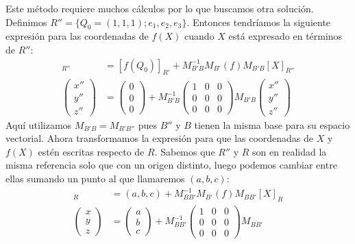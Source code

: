 \documentclass[14pt]{book}
\begin{document}
\begin{ej}
	Este método requiere muchos cálculos por lo que buscamos otra solución. Definimos $R'' = \{Q_0 = (1,1,1); e_1, e_2, e_3\}$. Entonces tendríamos la siguiente expresión para las coordenadas de $f(X)$ cuando $X$ está expresado en términos de $R''$:
		\begin{align*}
	[f(X)]_{R''} &= [f(Q_0)]_{R'} + M_{B'B}^{-1}M_{B'}(f)M_{B'B} [X]_{R''} \\
	\left(\begin{array}{c}
	x'' \\ y'' \\ z''
	\end{array}\right) &=
	\left(\begin{array}{c}
	0 \\ 0 \\ 0
	\end{array}\right) + M_{B'B}^{-1}
	\left(\begin{array}{ccc}
	1 & 0 & 0 \\ 0 & 0 & 0 \\ 0 & 0 & 0
	\end{array}\right) M_{B'B}
	\left(\begin{array}{c}
	x'' \\ y'' \\ z''
	\end{array}\right)
	\end{align*}
	Aquí utilizamos $M_{B'B} = M_{B'B''}$ pues $B''$ y $B$ tienen la misma base para su espacio vectorial. Ahora transformamos la expresión para que las coordenadas de $X$ y $f(X)$ estén escritas respecto de $R$. Sabemos que $R''$ y $R$ son en realidad la misma referencia solo que con un origen distinto, luego podemos cambiar entre ellas sumando un punto al que llamaremos $(a, b, c)$:
		\begin{align*}
	[f(X)]_R &= (a,b,c) + M_{BB'}^{-1}M_{B'}(f)M_{BB'} [X]_R \\
	\left(\begin{array}{c}
	x \\ y \\ z
	\end{array}\right) &=
	\left(\begin{array}{c}
	a \\ b \\ c
	\end{array}\right) + M_{BB'}^{-1}
	\left(\begin{array}{ccc}
	1 & 0 & 0 \\ 0 & 0 & 0 \\ 0 & 0 & 0
	\end{array}\right) M_{BB'}

\end{align*}
\end{ej}
\end{document}

